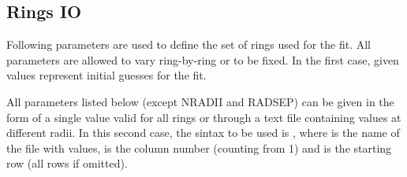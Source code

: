 \documentclass[letterpaper,10pt,english]{sphinxmanual}
\begin{document}
\subsection{Rings IO}
\label{\detokenize{tasks:ringio}}\label{\detokenize{tasks:rings-io}}
Following parameters are used to define the set of rings used for the fit. All parameters are allowed to vary ring-by-ring or to be fixed. In the first case, given values represent initial guesses for the fit.

All parameters listed below (except NRADII and RADSEP) can be given in the form of a single value valid for all rings or through a text file containing values at different radii. In this second case, the sintax to be used is , where  is the name of the file with values,  is the column number (counting from 1) and  is the starting row (all rows if omitted).
\end{document}
